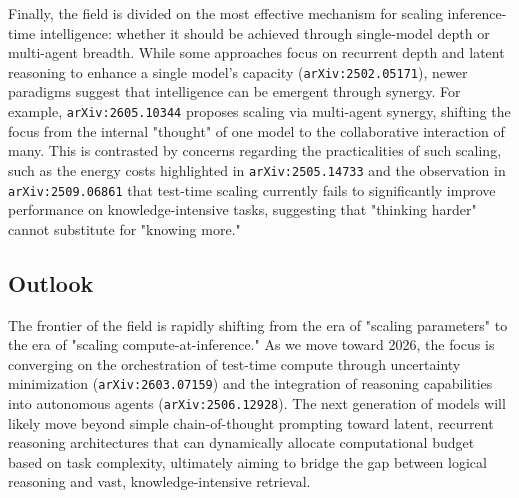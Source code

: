\documentclass[11pt]{article}
\begin{document}
Finally, the field is divided on the most effective mechanism for scaling inference-time intelligence: whether it should be achieved through single-model depth or multi-agent breadth. While some approaches focus on recurrent depth and latent reasoning to enhance a single model's capacity (\texttt{arXiv:2502.05171}), newer paradigms suggest that intelligence can be emergent through synergy. For example, \texttt{arXiv:2605.10344} proposes scaling via multi-agent synergy, shifting the focus from the internal "thought" of one model to the collaborative interaction of many. This is contrasted by concerns regarding the practicalities of such scaling, such as the energy costs highlighted in \texttt{arXiv:2505.14733} and the observation in \texttt{arXiv:2509.06861} that test-time scaling currently fails to significantly improve performance on knowledge-intensive tasks, suggesting that "thinking harder" cannot substitute for "knowing more."

\subsection{Outlook}

The frontier of the field is rapidly shifting from the era of "scaling parameters" to the era of "scaling compute-at-inference." As we move toward 2026, the focus is converging on the orchestration of test-time compute through uncertainty minimization (\texttt{arXiv:2603.07159}) and the integration of reasoning capabilities into autonomous agents (\texttt{arXiv:2506.12928}). The next generation of models will likely move beyond simple chain-of-thought prompting toward latent, recurrent reasoning architectures that can dynamically allocate computational budget based on task complexity, ultimately aiming to bridge the gap between logical reasoning and vast, knowledge-intensive retrieval.
\end{document}
